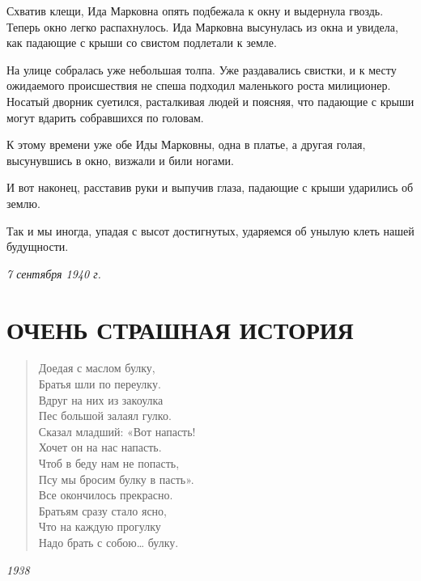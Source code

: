 \documentclass[a4paper,12pt]{article}
\begin{document}
Схватив клещи, Ида Марковна опять подбежала к окну и выдернула гвоздь. Теперь окно легко распахнулось. Ида Марковна высунулась из окна и увидела, как падающие с крыши со свистом подлетали к земле.

На улице собралась уже небольшая толпа. Уже раздавались свистки, и к месту ожидаемого происшествия не спеша подходил маленького роста милиционер. Носатый дворник суетился, расталкивая людей и поясняя, что падающие с крыши могут вдарить собравшихся по головам.

К этому времени уже обе Иды Марковны, одна в платье, а другая голая, высунувшись в окно, визжали и били ногами.

И вот наконец, расставив руки и выпучив глаза, падающие с крыши ударились об землю.

Так и мы иногда, упадая с высот достигнутых, ударяемся об унылую клеть нашей будущности.

\begin{flushright}
\textit{7 сентября 1940 г.}
\end{flushright}

\newpage

\section*{ОЧЕНЬ СТРАШНАЯ ИСТОРИЯ}

\begin{verse}
Доедая с маслом булку, \\
Братья шли по переулку. \\
Вдруг на них из закоулка \\
Пес большой залаял гулко. \\

Сказал младший: «Вот напасть! \\
Хочет он на нас напасть. \\
Чтоб в беду нам не попасть, \\
Псу мы бросим булку в пасть». \\

Все окончилось прекрасно. \\
Братьям сразу стало ясно, \\
Что на каждую прогулку \\
Надо брать с собою… булку.
\end{verse}

\begin{flushright}
\textit{1938}
\end{flushright}
\end{document}
